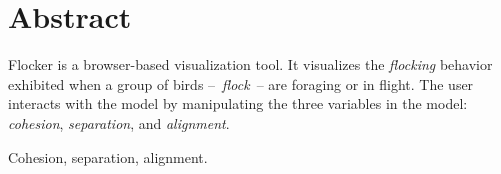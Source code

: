 \documentclass[../main]{subfiles}
\begin{document}
\section{Abstract}
\label{abstract}

Flocker is a browser-based visualization tool. It visualizes the {\em flocking} behavior exhibited when
a group of birds --~{\em flock}~-- are foraging or in flight. The user interacts with the model by
manipulating the three variables in the model: {\em cohesion}, {\em separation}, and {\em alignment}.

\begin{IEEEkeywords}
    Cohesion, separation, alignment.
\end{IEEEkeywords}
\end{document}

